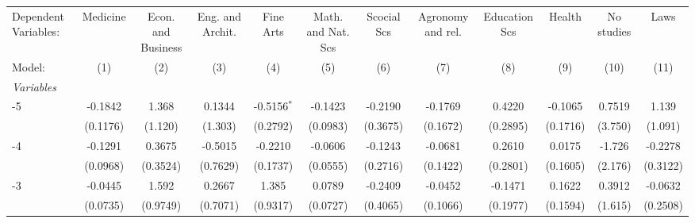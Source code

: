 \begingroup
\centering
\begin{adjustbox}{width=650}  
\begin{tabular}{lccccccccccc}
   \tabularnewline \midrule \midrule
   Dependent Variables:                     & Medicine               & Econ. and Business & Eng. and Archit. & Fine Arts      & Math. and Nat. Scs & Scocial Scs & Agronomy and rel. & Education Scs      & Health  & No studies              & Laws\\  
Model:                                   & (1)      & (2)                  & (3)                        & (4)           & (5)                           & (6)                         & (7)                   & (8)              & (9)           & (10)        & (11)\\  
   \midrule
   \emph{Variables}\\
    -5    & -0.1842  & 1.368                & 0.1344                     & -0.5156$^{*}$ & -0.1423                       & -0.2190                     & -0.1769               & 0.4220           & -0.1065       & 0.7519      & 1.139\\   
                                            & (0.1176) & (1.120)              & (1.303)                    & (0.2792)      & (0.0983)                      & (0.3675)                    & (0.1672)              & (0.2895)         & (0.1716)      & (3.750)     & (1.091)\\   
    -4    & -0.1291  & 0.3675               & -0.5015                    & -0.2210       & -0.0606                       & -0.1243                     & -0.0681               & 0.2610           & 0.0175        & -1.726      & -0.2278\\   
                                            & (0.0968) & (0.3524)             & (0.7629)                   & (0.1737)      & (0.0555)                      & (0.2716)                    & (0.1422)              & (0.2801)         & (0.1605)      & (2.176)     & (0.3122)\\   
    -3    & -0.0445  & 1.592                & 0.2667                     & 1.385         & 0.0789                        & -0.2409                     & -0.0452               & -0.1471          & 0.1622        & 0.3912      & -0.0632\\   
                                            & (0.0735) & (0.9749)             & (0.7071)                   & (0.9317)      & (0.0727)                      & (0.4065)                    & (0.1066)              & (0.1977)         & (0.1594)      & (1.615)     & (0.2508)\\   

\end{tabular}
\end{adjustbox}
